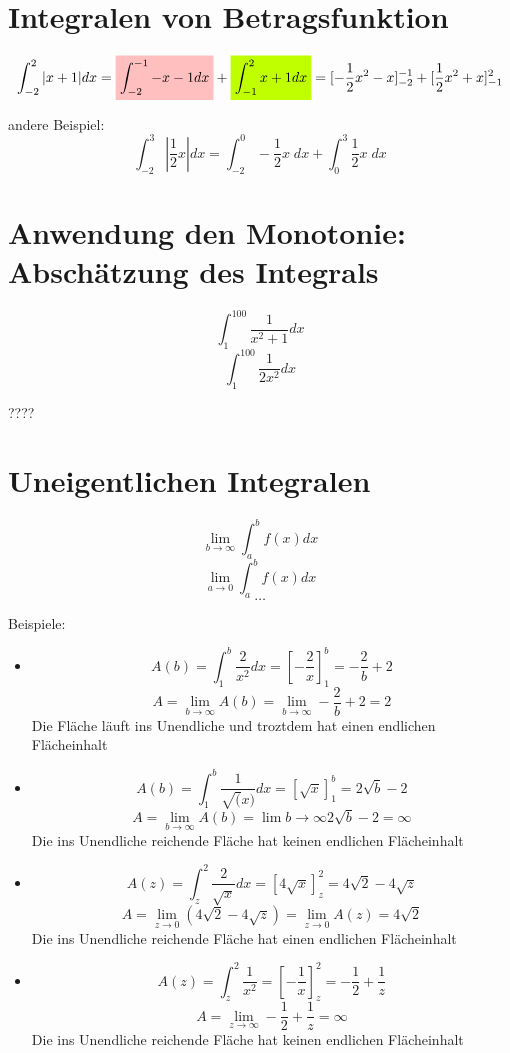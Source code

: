 \documentclass{book}
\newcommand{\mathcolorbox}[2]{\colorbox{#1}{$\displaystyle #2$}}
\begin{document}
\section {Integralen von Betragsfunktion}

\[\int_{-2}^2|x+1|dx = \mathcolorbox{pink}{\int_{-2}^{-1}-x-1 dx} + \mathcolorbox{lime}{\int_{-1}^2x+1dx} = [-\frac 12 x^2 - x ]_{-2}^{-1} + [\frac 12 x^2 + x ]_{-1}^{2} \]

andere Beispiel: 
\[\int_{-2}^3 |\frac 12 x|dx = \int_{-2}^0 -\frac 12 x\;dx + \int_0^3 \frac 12 x\;dx\]

\section{Anwendung den Monotonie: Abschätzung des Integrals}
\[\int_1^{100}\frac1{x^2+1}dx\]
\[\int_1^{100}\frac 1{2x^2}dx\]

????


\section{Uneigentlichen Integralen}
\[\lim_{b\to\infty}\int_a^bf(x)dx\]
\[\lim_{a\to0}\int_a^bf(x)dx\]
\[\dots\]
\raggedright
Beispiele:
\begin{itemize}

\item \[A(b) = \int_1^b \frac 2{x^2} dx = [-\frac 2x]_1^b = -\frac2b + 2\]
\[A = \lim_{b\to\infty}A(b) = \lim_{b\to\infty} -\frac 2b +2 = 2\]
Die Fläche läuft ins Unendliche und troztdem hat einen endlichen Flächeinhalt

\item \[A(b) = \int^b_1 \frac1{\sqrt(x)} dx = [\sqrt x]_1^b = 2\sqrt b - 2\]
\[A = \lim_{b\to\infty}A(b) = \lim{b\to\infty} 2\sqrt b - 2 = \infty \]
Die ins Unendliche reichende Fläche hat keinen endlichen Flächeinhalt

\item
\[A(z) = \int_z^2 \frac 2{\sqrt x}dx = [4 \sqrt x]_z^2 = 4\sqrt 2 - 4\sqrt z\]
\[A = \lim_{z\to 0} (4\sqrt 2 - 4\sqrt z) = \lim_{z\to 0} A(z) = 4\sqrt 2\]
Die ins Unendliche reichende Fläche hat einen endlichen Flächeinhalt

\item \[A(z) = \int_z^2 \frac 1 {x^2} = [-\frac 1x]_z^2 = -\frac 12 + \frac 1 z\]
\[A = \lim_{z\to \infty}-\frac 12 + \frac 1 z = \infty\] 
Die ins Unendliche reichende Fläche hat keinen endlichen Flächeinhalt
\end{itemize}
\end{document}
